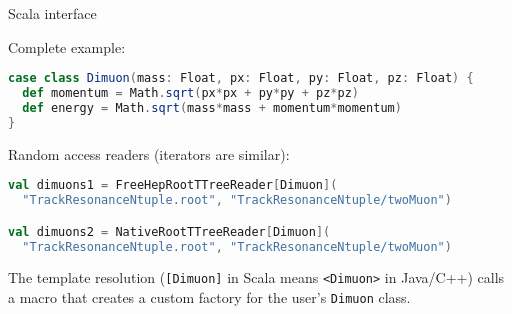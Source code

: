 \documentclass{beamer}
\begin{document}
\begin{frame}[fragile]{Scala interface}

Complete example:

\begin{minipage}{1.1\linewidth}
\begin{lstlisting}[language=scala]
case class Dimuon(mass: Float, px: Float, py: Float, pz: Float) {
  def momentum = Math.sqrt(px*px + py*py + pz*pz)
  def energy = Math.sqrt(mass*mass + momentum*momentum)
}
\end{lstlisting}
\end{minipage}

Random access readers (iterators are similar):

\begin{lstlisting}[language=scala]
val dimuons1 = FreeHepRootTTreeReader[Dimuon](
  "TrackResonanceNtuple.root", "TrackResonanceNtuple/twoMuon")

val dimuons2 = NativeRootTTreeReader[Dimuon](
  "TrackResonanceNtuple.root", "TrackResonanceNtuple/twoMuon")
\end{lstlisting}

The template resolution ({\tt [Dimuon]} in Scala means {\tt <Dimuon>} in Java/C++) calls a macro that creates a custom factory for the user's {\tt Dimuon} class.


\end{frame}
\end{document}
